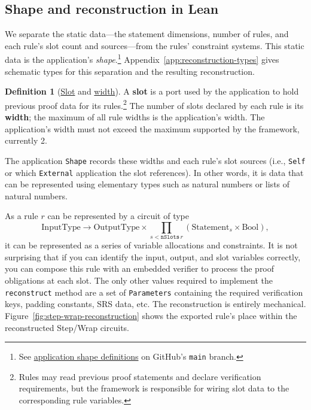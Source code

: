 \documentclass[11pt,a4paper]{article}
\newcommand{\inlinecode}[1]{\mbox{\texttt{#1}}}
\theoremstyle{definition}
\theoremstyle{insetstatement}
\newtheorem{definitiontext}[example]{Definition}
\newenvironment{statementblock}
  {\begin{list}{}{%
    \setlength{\leftmargin}{0pt}%
    \setlength{\rightmargin}{0pt}%
    \setlength{\labelwidth}{0pt}%
    \setlength{\labelsep}{0pt}%
    \setlength{\itemindent}{0pt}%
    \setlength{\listparindent}{0pt}%
    \setlength{\topsep}{.7\baselineskip plus 2pt minus 1pt}%
    \setlength{\partopsep}{0pt}%
    \setlength{\parsep}{0pt}%
    \setlength{\itemsep}{0pt}}%
    \item\relax}
  {\end{list}}
\newenvironment{definition}[1][]
  {\begin{statementblock}\begin{definitiontext}[{#1}]}
  {\end{definitiontext}\end{statementblock}}
\begin{document}
\subsection{Shape and reconstruction in Lean}
\label{sec:reconstruction}

We separate the static data---the statement dimensions, number of rules,
and each rule's slot count and sources---from the rules' constraint systems.
This static data is the application's \emph{shape}.\footnote{See
  \href{https://github.com/l-adic/snarky/blob/main/formal/pickles/Pickles/Application/Description.lean}{application shape definitions}
  on GitHub's \inlinecode{main} branch.}
Appendix~\ref{app:reconstruction-types} gives schematic types for this
separation and the resulting reconstruction.

\begin{definition}[\href{https://github.com/l-adic/snarky/blob/main/formal/pickles/Pickles/Application/Description.lean\#L75}{Slot} and \href{https://github.com/l-adic/snarky/blob/main/formal/pickles/Pickles/Application/Description.lean\#L78}{width}]
\label{def:slot-width}
A \textbf{slot} is a port used by the application to hold previous proof
data for its rules.\footnote{Rules may read previous proof statements and
  declare verification requirements, but the framework is responsible for
  wiring slot data to the corresponding rule variables.}
The number of slots declared
by each rule is its \textbf{width}; the maximum of all rule widths is the
application's width. The application's width must not exceed the maximum
supported by the framework, currently 2.
\end{definition}

The application \inlinecode{Shape} records these widths and each rule's slot
sources (i.e., \inlinecode{Self} or which \inlinecode{External} application the slot
references). In other words, it is data that can be represented using
elementary types such as natural numbers or lists of natural numbers.

As a rule $r$ can be represented by a circuit of type
\[
  \mathrm{InputType} \to \mathrm{OutputType}
  \times \prod_{s < \mathtt{nSlots}\,r}
    (\mathrm{Statement}_s \times \mathrm{Bool}),
\]
it can be represented as a series of variable allocations and constraints.
It is not surprising that if you can identify the input, output, and slot
variables correctly, you can compose this rule with an embedded verifier
to process the proof obligations at each slot. The only other values
required to implement the \inlinecode{reconstruct} method are a set of
\inlinecode{Parameters} containing the required verification keys, padding
constants, SRS data, etc. The reconstruction is entirely mechanical.
Figure~\ref{fig:step-wrap-reconstruction} shows the exported rule's place
within the reconstructed Step/Wrap circuits.
\end{document}
